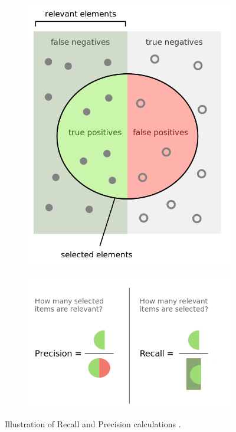         \begin{figure}[H]
            \centering
            \captionsetup{justification=centering}
            \begin{subfigure}{0.25\textwidth}
                \includegraphics[width=\textwidth]{Sections/5ImageClef/images/f1_1.png}
                \end{subfigure}
                \begin{subfigure}{0.4\textwidth}
                \includegraphics[width=\textwidth]{Sections/5ImageClef/images/f1_2.png}
                \end{subfigure}
            \caption[Illustration of recall and precision calculation]{Illustration of Recall and Precision calculations \cite{Wikipedia2020}.}   
            \label{fig:ex_f1}    
        \end{figure}    
           
